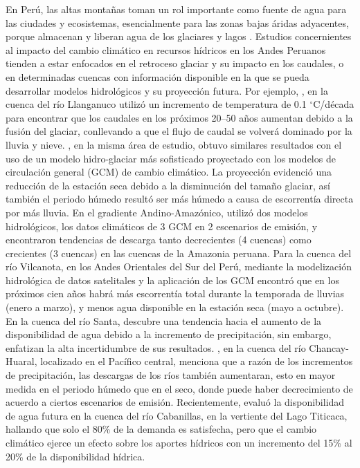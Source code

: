 \documentclass[12pt]{article}
\begin{document}
En Perú, las altas montañas toman un rol importante como fuente de agua para las ciudades y ecosistemas, esencialmente para las zonas bajas áridas adyacentes, porque almacenan y liberan agua de los glaciares y lagos \citep{Coudrain2005,Barnett2005,Viviroli2011}. Estudios concernientes al impacto del cambio climático en recursos hídricos en los Andes Peruanos tienden a estar enfocados en el retroceso glaciar \citep{VUILLE2018195,drenkhan2018current} y su impacto en los caudales, o en determinadas cuencas con información disponible en la que se pueda desarrollar modelos hidrológicos y su proyección futura. Por ejemplo, \citet{Pouyaud2005}, en la cuenca del río Llanganuco utilizó un incremento de temperatura de 0.1 $^{\circ}$C/década para encontrar que los caudales en los próximos 20–50 años aumentan debido a la fusión del glaciar, conllevando a que el flujo de caudal se volverá dominado por la lluvia y nieve. \citet{Juen2007}, en la misma área de estudio, obtuvo similares resultados con el uso de un modelo hidro-glaciar más sofisticado proyectado con los modelos de circulación general (GCM) de cambio climático. La proyección evidenció una reducción de la estación seca debido a la disminución del tamaño glaciar, así también el periodo húmedo resultó ser más húmedo a causa de escorrentía directa por más lluvia. En el gradiente Andino-Amazónico, \citet{LavadoCasimiro2011} utilizó dos modelos hidrológicos, los datos climáticos de 3 GCM en 2 escenarios de emisión, y encontraron tendencias de descarga tanto decrecientes (4 cuencas) como crecientes (3 cuencas) en las cuencas de la Amazonia peruana. Para la cuenca del río Vilcanota, en los Andes Orientales del Sur del Perú, \citet{Andres2014} mediante la modelización hidrológica de datos satelitales y la aplicación de los GCM encontró que en los próximos cien años habrá más escorrentía total durante la temporada de lluvias (enero a marzo), y menos agua disponible en la estación seca (mayo a octubre). En la cuenca del río Santa, \citet{VanSoesbergen2016} descubre una tendencia hacia el aumento de la disponibilidad de agua debido a la incremento de precipitación, sin embargo, enfatizan la alta incertidumbre de sus resultados. \citet{Olsson2017}, en la cuenca del río Chancay-Huaral, localizado en el Pacífico central, menciona que a razón de los incrementos de precipitación, las descargas de los ríos también aumentaran, esto en mayor medida en el periodo húmedo que en el seco, donde puede haber decrecimiento de acuerdo a ciertos escenarios de emisión. Recientemente, \citet{Pilares2018} evaluó la disponibilidad de agua futura en la cuenca del río Cabanillas, en la vertiente del Lago Titicaca, hallando que solo el 80\% de la demanda es satisfecha, pero que el cambio climático ejerce un efecto sobre los aportes hídricos con un incremento del 15\% al 20\% de la disponibilidad hídrica. 
\end{document}
